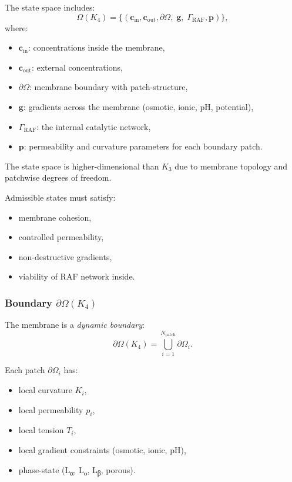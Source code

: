 The state space includes:
\[
\Omega(K_4) =
\{(\mathbf{c}_{\mathrm{in}},\mathbf{c}_{\mathrm{out}},
  \partial\Omega,\; \mathbf{g},\; \Gamma_{\mathrm{RAF}},
  \mathbf{p})\},
\]
where:
\begin{itemize}
    \item $\mathbf{c}_{\mathrm{in}}$: concentrations inside the membrane,
    \item $\mathbf{c}_{\mathrm{out}}$: external concentrations,
    \item $\partial\Omega$: membrane boundary with patch-structure,
    \item $\mathbf{g}$: gradients across the membrane (osmotic, ionic,
          pH, potential),
    \item $\Gamma_{\mathrm{RAF}}$: the internal catalytic network,
    \item $\mathbf{p}$: permeability and curvature parameters for each
          boundary patch.
\end{itemize}

The state space is higher-dimensional than $K_3$ due to membrane topology
and patchwise degrees of freedom.

Admissible states must satisfy:
\begin{itemize}
    \item membrane cohesion,
    \item controlled permeability,
    \item non-destructive gradients,
    \item viability of RAF network inside.
\end{itemize}

\subsubsection{Boundary \texorpdfstring{$\partial\Omega(K_4)$}{\partial\Omega(K_4)}}

The membrane is a \emph{dynamic boundary}:
\[
\partial\Omega(K_4) = \bigcup_{i=1}^{N_{\mathrm{patch}}}
    \partial\Omega_i.
\]

Each patch $\partial\Omega_i$ has:
\begin{itemize}
    \item local curvature $K_i$,
    \item local permeability $p_i$,
    \item local tension $T_i$,
    \item local gradient constraints (osmotic, ionic, pH),
    \item phase-state (L\textsubscript{α}, L\textsubscript{o},
          L\textsubscript{β}, porous).
\end{itemize}

